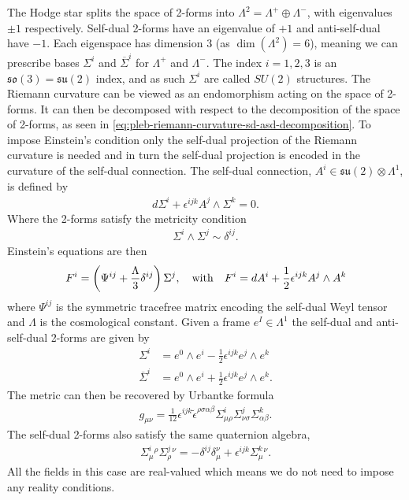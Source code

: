 \documentclass[10pt]{report}
\newcommand{\urb}[0]{Urbantke}
\theoremstyle{definition}
\newcommand{\asd}[0]{\overline{\Sigma}}
\newcommand{\teps}[0]{\tilde{\epsilon}}
\begin{document}
The Hodge star splits the space of 2-forms into $\Lambda^2 = \Lambda^+ \oplus \Lambda^-$, with eigenvalues $\pm 1$ respectively. Self-dual 2-forms have an eigenvalue of $+1$ and anti-self-dual have $-1$. Each eigenspace has dimension 3 (as $\dim(\Lambda^2) = 6$), meaning we can prescribe bases $\Sigma^i$ and $\asd^i$ for $\Lambda^+$ and $\Lambda^-$. The index $i = 1,2,3$ is an $\mathfrak{so}(3) = \mathfrak{su}(2)$ index, and as such $\Sigma^i$ are called $SU(2)$ structures. The Riemann curvature can be viewed as an endomorphism acting on the space of 2-forms. It can then be decomposed with respect to the decomposition of the space of 2-forms, as seen in \cref{eq:pleb-riemann-curvature-sd-asd-decomposition}. To impose Einstein's condition only the self-dual projection of the Riemann curvature is needed and in turn the self-dual projection is encoded in the curvature of the self-dual connection. The self-dual connection, $A^i \in \mathfrak{su}(2) \otimes \Lambda^1$, is defined by 
\begin{align}
    d\Sigma^i + \epsilon^{ijk} A^j \wedge \Sigma^k = 0.
\end{align}
Where the 2-forms satisfy the metricity condition
\begin{align}
    \Sigma^i \wedge \Sigma^j \sim \delta^{ij}.
\end{align}
Einstein's equations are then
\begin{align}
    F^i = \left( \Psi^{ij} + \frac{\Lambda}{3} \delta^{ij} \right) \Sigma^j, \quad {\rm with} \quad F^i = dA^i + \frac{1}{2} \epsilon^{ijk} A^j \wedge A^k \label{eq:kerr-self-dual-curvature-decomposition}
\end{align}
where $\Psi^{ij}$ is the symmetric tracefree matrix encoding the self-dual Weyl tensor and $\Lambda$ is the cosmological constant. Given a frame $e^I \in \Lambda^1$ the self-dual and anti-self-dual 2-forms are given by 
\begin{align}
    \Sigma^i & = e^0 \wedge e^i - \frac{1}{2} \epsilon^{ijk} e^j \wedge e^k \label{eq:kerr-self-dual-2-forms-in-frame} \\
    \asd^i & = e^0 \wedge e^i + \frac{1}{2} \epsilon^{ijk} e^j \wedge e^k. \label{eq:kerr-anti-self-dual-2-forms-in-frame}
\end{align}
The metric can then be recovered by \urb{} formula 
\begin{align}
    g_{\mu\nu} = \frac{1}{12} \epsilon^{ijk} \teps^{\rho\sigma\alpha\beta} \Sigma^i_{\mu\rho} \Sigma^j_{\nu\sigma} \Sigma^k_{\alpha\beta}. \label{eq:kerr-euclidean-urbantke-formula}
\end{align}
The self-dual 2-forms also satisfy the same quaternion algebra,
\begin{align}
    \Sigma^i_\mu{}^\rho \Sigma^j_\rho{}^\nu = -\delta^{ij} \delta_\mu^\nu + \epsilon^{ijk} \Sigma^k_\mu{}^\nu. \label{eq:kerr-sigma-quaternion-algebra}
\end{align}
All the fields in this case are real-valued which means we do not need to impose any reality conditions.
\end{document}
